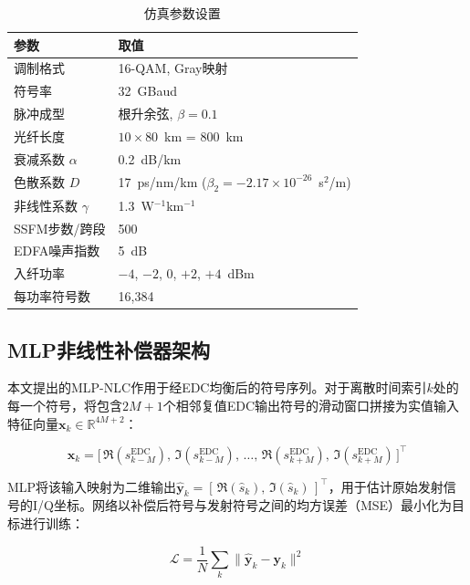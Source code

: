 \documentclass[conference]{IEEEtran}
\begin{document}
\begin{table}[h]
\centering
\caption{仿真参数设置}
\label{tab:params}
\begin{tabular}{@{}ll@{}}
\toprule
\textbf{参数} & \textbf{取值} \\
\midrule
调制格式     & 16-QAM, Gray映射 \\
符号率           & 32~GBaud \\
脉冲成型           & 根升余弦, $\beta = 0.1$ \\
光纤长度          & $10 \times 80$~km = 800~km \\
衰减系数 $\alpha$  & 0.2~dB/km \\
色散系数 $D$        & 17~ps/nm/km ($\beta_2 = -2.17 \times 10^{-26}$~s$^2$/m) \\
非线性系数 $\gamma$ & 1.3~W$^{-1}$km$^{-1}$ \\
SSFM步数/跨段       & 500 \\
EDFA噪声指数     & 5~dB \\
入纤功率         & $-4$, $-2$, 0, $+2$, $+4$~dBm \\
每功率符号数     & 16,384 \\
\bottomrule
\end{tabular}
\end{table}

\subsection{MLP非线性补偿器架构}

本文提出的MLP-NLC作用于经EDC均衡后的符号序列。对于离散时间索引$k$处的每一个符号，将包含$2M + 1$个相邻复值EDC输出符号的滑动窗口拼接为实值输入特征向量$\mathbf{x}_k \in \mathbb{R}^{4M + 2}$：

\begin{equation}
\mathbf{x}_k = \bigl[\,\Re(s_{k-M}^{\text{EDC}}),\,\Im(s_{k-M}^{\text{EDC}}),\,\dots,\,
\Re(s_{k+M}^{\text{EDC}}),\,\Im(s_{k+M}^{\text{EDC}})\,\bigr]^\top
\label{eq:features}
\end{equation}

MLP将该输入映射为二维输出$\hat{\mathbf{y}}_k = [\,\Re(\hat{s}_k),\,\Im(\hat{s}_k)\,]^\top$，用于估计原始发射信号的I/Q坐标。网络以补偿后符号与发射符号之间的均方误差（MSE）最小化为目标进行训练：

\begin{equation}
\mathcal{L} = \frac{1}{N}\sum_{k} \bigl\| \hat{\mathbf{y}}_k - \mathbf{y}_k \bigr\|^2
\label{eq:loss}
\end{equation}
\end{document}
